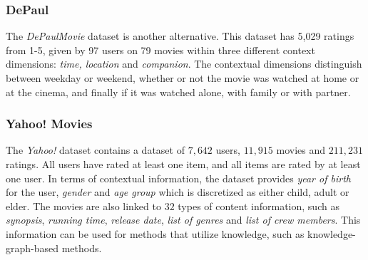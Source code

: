 \subsubsection{DePaul}
The \textit{DePaulMovie} dataset is another alternative.
This dataset has 5,029 ratings from 1-5, given by 97 users on 79 movies within three different context dimensions: \textit{time, location} and \textit{companion}\cite{DePaulData}.
The contextual dimensions distinguish between weekday or weekend, whether or not the movie was watched at home or at the cinema, and finally if it was watched alone, with family or with partner.

\subsubsection{Yahoo! Movies}
The \textit{Yahoo!} dataset contains a dataset of $7,642$ users, $11,915$ movies and $211,231$ ratings.
All users have rated at least one item, and all items are rated by at least one user.
In terms of contextual information, the dataset provides \textit{year of birth} for the user, \textit{gender} and \textit{age group} which is discretized as either child, adult or elder.
The movies are also linked to $32$ types of content information, such as \textit{synopsis}, \textit{running time}, \textit{release date}, \textit{list of genres} and \textit{list of crew members}.
This information can be used for methods that utilize knowledge, such as knowledge-graph-based methods.

